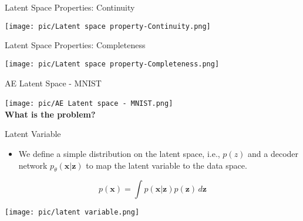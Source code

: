 \documentclass[serif, aspectratio=169]{beamer}
\begin{document}
\begin{frame}{Latent Space Properties: Continuity}
      \begin{center}
        \texttt{[image: pic/Latent space property-Continuity.png]} 
    \end{center}
\end{frame}


\begin{frame}{Latent Space Properties: Completeness}
      \begin{center}
        \texttt{[image: pic/Latent space property-Completeness.png]} 
    \end{center}
\end{frame}

\begin{frame}{AE Latent Space - MNIST}
    \begin{center}
        \texttt{[image: pic/AE Latent space - MNIST.png]}
        {\color{deepred}\textbf{\\ What is the problem?}}
    \end{center}
\end{frame}

\begin{frame}{Latent Variable}
    \begin{itemize}
        \item We define a simple distribution on the latent space, i.e., \( p(z) \) and a decoder network \( p_\theta(\mathbf{x} | \mathbf{z}) \) to map the latent variable to the data space.
    \end{itemize}

    \vspace{0.1cm}

    \begin{equation*}
        p(\mathbf{x}) = \int p(\mathbf{x} | \mathbf{z}) p(\mathbf{z}) \, d\mathbf{z}
    \end{equation*}

    \begin{center}
        \texttt{[image: pic/latent variable.png]}
    \end{center}
\end{frame}
\end{document}
